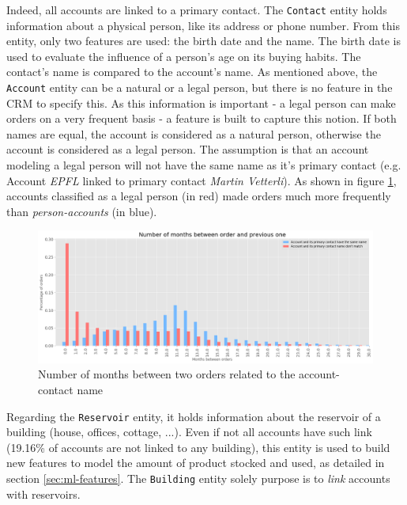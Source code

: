 Indeed, all accounts are linked to a primary contact. The \texttt{Contact} entity holds information about a physical person, like its address or phone number. From this entity, only two features are used: the birth date and the name. The birth date is used to evaluate the influence of a person's age on its buying habits. The contact's name is compared to the account's name. As mentioned above, the \texttt{Account} entity can be a natural or a legal person, but there is no feature in the CRM to specify this. As this information is important - a legal person can make orders on a very frequent basis - a feature is built to capture this notion. If both names are equal, the account is considered as a natural person, otherwise the account is considered as a legal person. The assumption is that an account modeling a legal person will not have the same name as it's primary contact (e.g. Account \textit{EPFL} linked to primary contact \textit{Martin Vetterli}). As shown in figure \ref{fig:account-contact-name-orders}, accounts classified as a legal person (in red) made orders much more frequently than \textit{person-accounts} (in blue).

\begin{figure}[h]
    \centering
    \includegraphics[width=15cm]{images/account-contact-name-orders.png}
    \caption[Account and contact's name influence of order's frequency]{Number of months between two orders related to the account-contact name}
    \label{fig:account-contact-name-orders}
\end{figure}

Regarding the \texttt{Reservoir} entity, it holds information about the reservoir of a building (house, offices, cottage, ...). Even if not all accounts have such link (19.16\% of accounts are not linked to any building), this entity is used to build new features to model the amount of product stocked and used, as detailed in section \ref{sec:ml-features}. The \texttt{Building} entity solely purpose is to \textit{link} accounts with reservoirs.

